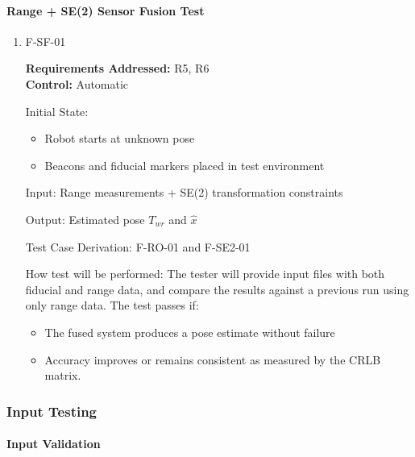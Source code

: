 \documentclass[12pt, titlepage]{article}
\begin{document}
\paragraph{Range + SE(2) Sensor Fusion Test}
\begin{enumerate}
\item{F-SF-01}

\textbf{Requirements Addressed:} R5, R6\\
\textbf{Control:} Automatic
					
Initial State: 
\begin{itemize}
  \item Robot starts at unknown pose
  \item Beacons and fiducial markers placed in test environment
\end{itemize}
					
Input: Range measurements + SE(2) transformation constraints

Output: Estimated pose $T_{wr}$ and $\hat{x}$

Test Case Derivation: F-RO-01 and F-SE2-01

How test will be performed: The tester will provide input files with both fiducial and range data, and compare the results against a previous run using only range data. The test passes if:
\begin{itemize}
  \item The fused system produces a pose estimate without failure
  \item Accuracy improves or remains consistent as measured by the CRLB matrix.
\end{itemize}

\end{enumerate}

\subsubsection{Input Testing}
\paragraph{Input Validation}
\end{document}
